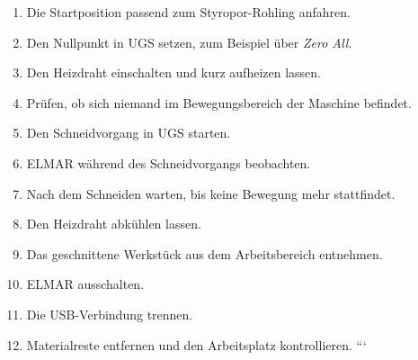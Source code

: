 \begin{enumerate}
	\item Die Startposition passend zum Styropor-Rohling anfahren.
	
	\item Den Nullpunkt in UGS setzen, zum Beispiel über \textit{Zero All}.
	
	\item Den Heizdraht einschalten und kurz aufheizen lassen.
	
	\item Prüfen, ob sich niemand im Bewegungsbereich der Maschine befindet.
	
	\item Den Schneidvorgang in UGS starten.
	
	\item ELMAR während des Schneidvorgangs beobachten.
	
	\item Nach dem Schneiden warten, bis keine Bewegung mehr stattfindet.
	
	\item Den Heizdraht abkühlen lassen.
	
	\item Das geschnittene Werkstück aus dem Arbeitsbereich entnehmen.
	
	\item ELMAR ausschalten.
	
	\item Die USB-Verbindung trennen.
	
	\item Materialreste entfernen und den Arbeitsplatz kontrollieren.
	```
	
\end{enumerate}
